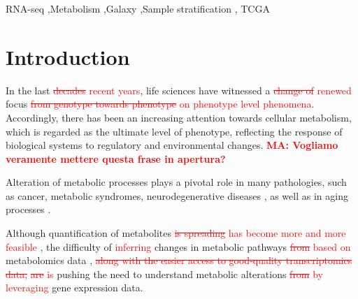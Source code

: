 \documentclass[preprint,12pt,authoryear]{elsarticle}
\newcommand{\red}{\textcolor{red}}
\begin{document}
\begin{frontmatter}

  \begin{keyword}
    RNA-seq \sep Metabolism \sep Galaxy \sep Sample stratification \sep
    TCGA



  \end{keyword}

\end{frontmatter}




\section{Introduction}

In the last \red{\sout{decades} recent years}, life sciences have
witnessed a \red{\sout{change of} renewed} focus
\red{\sout{from genotype towards phenotype} on phenotype level phenomena}. Accordingly, there has been an
increasing attention towards cellular metabolism, which is regarded as
the ultimate level of phenotype, reflecting the response of biological
systems to regulatory and environmental changes. \red{\bfseries MA:
  Vogliamo veramente mettere questa frase in apertura?}

Alteration of metabolic processes plays a pivotal role in many
pathologies, such as cancer, metabolic syndromes, neurodegenerative
diseases \citep{hotamisligil2006inflammation,ward2012metabolic}, as
well as in aging processes \citep{lopez2016metabolic}.

Although quantification of metabolites \red{\sout{is spreading} has
  become more and more feasible}
\citep{Holmes2008}, the difficulty of \textcolor{red}{inferring}
changes in metabolic pathways \red{\sout{from} based on} metabolomics data
\citep{damiani2016linking},
%
\red{\sout{along with the easier access to
    good-quality transcriptomics data,}}
%
\red{\sout{are} is} pushing the need to understand
metabolic alterations \red{\sout{from} by leveraging} gene expression
data.
\end{document}
